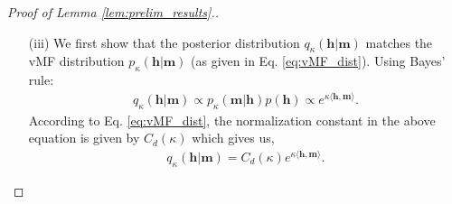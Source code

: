 \documentclass[12pt]{article}
\theoremstyle{definition}
\theoremstyle{remark}
\begin{document}
\begin{proof}[Proof of Lemma \ref{lem:prelim_results}.]
\begin{itemize}
    \begin{align*}
    P(X_i \le a, X_j \le b) = P(X_i \le a) P(X_j \le b).
    \end{align*}
    This holds for any pair $i \neq j$, and therefore the set of random variables $\{X_1, \dots, X_n\}$ are mutually independent.

    Next, we characterize the distribution of $X_i$'s. Since the uniform distribution on $\mathcal{S}^{d-1}$ is invariant under orthogonal transformations, the distribution of the inner product $X_i = \langle \mathbf{Y}, \mathbf{Y}_i \rangle$ is independent of the orientation of the reference vector $\mathbf{m}$. Therefore, without loss of generality, we can choose $\mathbf{m} = \mathbf{e}_d = (0, 0, \dots, 0, 1)$. For this choice of $\mathbf{m}$, we can generate samples from $\text{Unif}\big(\mathcal{S}(\mathbf{e}_d)\big)$ as follows: first sample $\tilde{\mathbf{Y}} \sim \text{Unif}\big(\mathcal{S}^{d-2}\big)$, then set $\mathbf{Y} = (\tilde{\mathbf{Y}}, 0)$. Similarly, we can write $\mathbf{Y}_i = (\tilde{\mathbf{Y}}_i, 0)$, where $\tilde{\mathbf{Y}}_i$'s are independent samples from $\text{Unif}\big(\mathcal{S}^{d-2}\big)$. Consequently, $X_i = \langle \mathbf{Y}, \mathbf{Y}_i \rangle = \langle \tilde{\mathbf{Y}}, \tilde{\mathbf{Y}}_i \rangle$. Note that $\tilde{\mathbf{Y}}_i \sim \text{Unif}\big(\mathcal{S}^{d-2}\big)$ is equivalent to $\tilde{\mathbf{Y}}_i$ following the vMF distribution $p_{0}(\cdot | \tilde{\mathbf{Y}})$ with $\kappa = 0$, and dimension $d-1$. Therefore, by Lemma \ref{lem:prelim_results}\ref{lem:fidelity_dist}, the probability density function of $X_i$ is given by $p_{0,d-1}(x) = \tilde{C}_{d-1}(0) (1-x^2)^{\frac{d-4}{2}}$.

    \item[(iii)] We first show that the posterior distribution $q_{\kappa}(\mathbf{h} | \mathbf{m})$ matches the vMF distribution $p_\kappa(\mathbf{h} | \mathbf{m})$ (as given in Eq. \eqref{eq:vMF_dist}). Using Bayes' rule:
    \begin{align*}
        q_{\kappa}(\mathbf{h} | \mathbf{m}) \propto p_\kappa(\mathbf{m} | \mathbf{h}) p(\mathbf{h}) \propto e^{\kappa \langle \mathbf{h}, \mathbf{m} \rangle}.
    \end{align*}
    According to Eq. \eqref{eq:vMF_dist}, the normalization constant in the above equation is given by $C_d(\kappa)$ which gives us,
    \begin{align*}
        q_{\kappa}(\mathbf{h} | \mathbf{m}) = C_d(\kappa) e^{\kappa \langle \mathbf{h}, \mathbf{m} \rangle}.
    \end{align*}


\end{itemize}
\end{proof}
\end{document}

